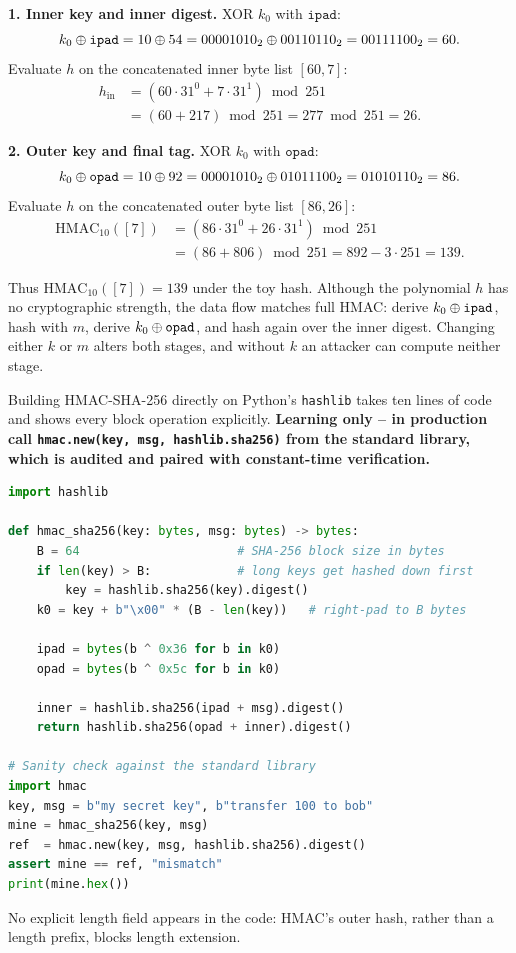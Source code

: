 \begin{walkbox}
\textbf{1. Inner key and inner digest.} XOR $k_0$ with $\texttt{ipad}$:
\[
  k_0 \oplus \texttt{ipad} = 10 \oplus 54 = 00001010_2 \oplus 00110110_2 = 00111100_2 = 60.
\]
Evaluate $h$ on the concatenated inner byte list $[60, 7]$:
\begin{align*}
  h_{\mathrm{in}}
    &= (60\cdot 31^{0} + 7\cdot 31^{1}) \bmod 251 \\
    &= (60 + 217) \bmod 251 = 277 \bmod 251 = 26.
\end{align*}

\textbf{2. Outer key and final tag.} XOR $k_0$ with $\texttt{opad}$:
\[
  k_0 \oplus \texttt{opad} = 10 \oplus 92 = 00001010_2 \oplus 01011100_2 = 01010110_2 = 86.
\]
Evaluate $h$ on the concatenated outer byte list $[86, 26]$:
\begin{align*}
  \mathrm{HMAC}_{10}([7])
    &= (86\cdot 31^{0} + 26\cdot 31^{1}) \bmod 251 \\
    &= (86 + 806) \bmod 251 = 892 - 3\cdot 251 = 139.
\end{align*}
\end{walkbox}

Thus $\mathrm{HMAC}_{10}([7]) = 139$ under the toy hash. Although the polynomial $h$ has no cryptographic strength, the data flow matches full HMAC: derive $k_0 \oplus \texttt{ipad}$, hash with $m$, derive $k_0 \oplus \texttt{opad}$, and hash again over the inner digest. Changing either $k$ or $m$ alters both stages, and without $k$ an attacker can compute neither stage.

\begin{implementbox}
Building HMAC-SHA-256 directly on Python's \texttt{hashlib} takes ten lines of code and shows every block operation explicitly. \textbf{Learning only -- in production call \texttt{hmac.new(key, msg, hashlib.sha256)} from the standard library, which is audited and paired with constant-time verification.}
\begin{lstlisting}[language=Python]
import hashlib

def hmac_sha256(key: bytes, msg: bytes) -> bytes:
    B = 64                      # SHA-256 block size in bytes
    if len(key) > B:            # long keys get hashed down first
        key = hashlib.sha256(key).digest()
    k0 = key + b"\x00" * (B - len(key))   # right-pad to B bytes

    ipad = bytes(b ^ 0x36 for b in k0)
    opad = bytes(b ^ 0x5c for b in k0)

    inner = hashlib.sha256(ipad + msg).digest()
    return hashlib.sha256(opad + inner).digest()

# Sanity check against the standard library
import hmac
key, msg = b"my secret key", b"transfer 100 to bob"
mine = hmac_sha256(key, msg)
ref  = hmac.new(key, msg, hashlib.sha256).digest()
assert mine == ref, "mismatch"
print(mine.hex())
\end{lstlisting}
No explicit length field appears in the code: HMAC's outer hash, rather than a length prefix, blocks length extension.
\end{implementbox}

